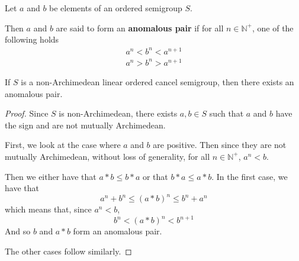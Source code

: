 \begin{definition}\label{def:anomalous_pair}\leanok
Let $a$ and $b$ be elements of an ordered semigroup $S$.

Then $a$ and $b$ are said to form an \textbf{anomalous pair}
if for all $n\in \mathbb{N}^+$, one of the following holds
\begin{align}
a^n < b^n < a^{n+1} \\
a^n > b^n > a^{n+1}
\end{align}
\end{definition}

\begin{theorem}\label{non_arch_anomalous}\leanok
{}
If $S$ is a non-Archimedean linear ordered cancel semigroup, then there exists an anomalous pair.
\end{theorem}
\begin{proof}
Since $S$ is non-Archimedean, there exists $a,b\in S$ such that
$a$ and $b$ have the sign and are not mutually Archimedean.

First, we look at the case where $a$ and $b$ are positive.
Then since they are not mutually Archimedean, without loss of generality, for all $n\in \mathbb{N}^+$,
$a^n < b$.

Then we either have that $a * b \le b * a$ or that $b*a\le a * b$.
In the first case, we have that
\[
a^n + b^n \le (a*b)^n \le b^n + a^n
\]
which means that, since $a^n < b$,
\[
b^n < (a*b)^n < b^{n+1}
\]
And so $b$ and $a*b$ form an anomalous pair.

The other cases follow similarly.
\end{proof}

